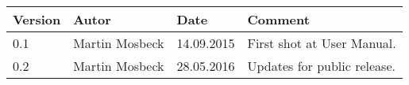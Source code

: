 
\begin{table}[h]
\begin{tabular*}{14.7cm}{|p{}|p{}|p{2cm}|p{}|}
\hline 
Version & Autor & Date & Comment \\[2pt]
\hline
\hline

0.1 & Martin Mosbeck & 14.09.2015 & First shot at User Manual. \\[2pt]
\hline 
0.2 & Martin Mosbeck & 28.05.2016 & Updates for public release. \\[2pt]
\hline 
\end{tabular*}
\end{table}


